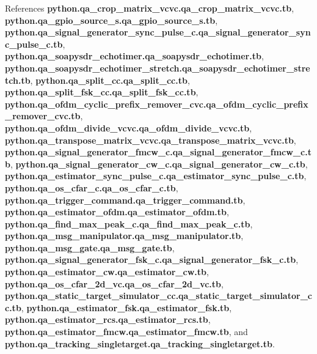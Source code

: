 References {\bf python.\+qa\+\_\+crop\+\_\+matrix\+\_\+vcvc.\+qa\+\_\+crop\+\_\+matrix\+\_\+vcvc.\+tb}, {\bf python.\+qa\+\_\+gpio\+\_\+source\+\_\+s.\+qa\+\_\+gpio\+\_\+source\+\_\+s.\+tb}, {\bf python.\+qa\+\_\+signal\+\_\+generator\+\_\+sync\+\_\+pulse\+\_\+c.\+qa\+\_\+signal\+\_\+generator\+\_\+sync\+\_\+pulse\+\_\+c.\+tb}, {\bf python.\+qa\+\_\+soapysdr\+\_\+echotimer.\+qa\+\_\+soapysdr\+\_\+echotimer.\+tb}, {\bf python.\+qa\+\_\+soapysdr\+\_\+echotimer\+\_\+stretch.\+qa\+\_\+soapysdr\+\_\+echotimer\+\_\+stretch.\+tb}, {\bf python.\+qa\+\_\+split\+\_\+cc.\+qa\+\_\+split\+\_\+cc.\+tb}, {\bf python.\+qa\+\_\+split\+\_\+fsk\+\_\+cc.\+qa\+\_\+split\+\_\+fsk\+\_\+cc.\+tb}, {\bf python.\+qa\+\_\+ofdm\+\_\+cyclic\+\_\+prefix\+\_\+remover\+\_\+cvc.\+qa\+\_\+ofdm\+\_\+cyclic\+\_\+prefix\+\_\+remover\+\_\+cvc.\+tb}, {\bf python.\+qa\+\_\+ofdm\+\_\+divide\+\_\+vcvc.\+qa\+\_\+ofdm\+\_\+divide\+\_\+vcvc.\+tb}, {\bf python.\+qa\+\_\+transpose\+\_\+matrix\+\_\+vcvc.\+qa\+\_\+transpose\+\_\+matrix\+\_\+vcvc.\+tb}, {\bf python.\+qa\+\_\+signal\+\_\+generator\+\_\+fmcw\+\_\+c.\+qa\+\_\+signal\+\_\+generator\+\_\+fmcw\+\_\+c.\+tb}, {\bf python.\+qa\+\_\+signal\+\_\+generator\+\_\+cw\+\_\+c.\+qa\+\_\+signal\+\_\+generator\+\_\+cw\+\_\+c.\+tb}, {\bf python.\+qa\+\_\+estimator\+\_\+sync\+\_\+pulse\+\_\+c.\+qa\+\_\+estimator\+\_\+sync\+\_\+pulse\+\_\+c.\+tb}, {\bf python.\+qa\+\_\+os\+\_\+cfar\+\_\+c.\+qa\+\_\+os\+\_\+cfar\+\_\+c.\+tb}, {\bf python.\+qa\+\_\+trigger\+\_\+command.\+qa\+\_\+trigger\+\_\+command.\+tb}, {\bf python.\+qa\+\_\+estimator\+\_\+ofdm.\+qa\+\_\+estimator\+\_\+ofdm.\+tb}, {\bf python.\+qa\+\_\+find\+\_\+max\+\_\+peak\+\_\+c.\+qa\+\_\+find\+\_\+max\+\_\+peak\+\_\+c.\+tb}, {\bf python.\+qa\+\_\+msg\+\_\+manipulator.\+qa\+\_\+msg\+\_\+manipulator.\+tb}, {\bf python.\+qa\+\_\+msg\+\_\+gate.\+qa\+\_\+msg\+\_\+gate.\+tb}, {\bf python.\+qa\+\_\+signal\+\_\+generator\+\_\+fsk\+\_\+c.\+qa\+\_\+signal\+\_\+generator\+\_\+fsk\+\_\+c.\+tb}, {\bf python.\+qa\+\_\+estimator\+\_\+cw.\+qa\+\_\+estimator\+\_\+cw.\+tb}, {\bf python.\+qa\+\_\+os\+\_\+cfar\+\_\+2d\+\_\+vc.\+qa\+\_\+os\+\_\+cfar\+\_\+2d\+\_\+vc.\+tb}, {\bf python.\+qa\+\_\+static\+\_\+target\+\_\+simulator\+\_\+cc.\+qa\+\_\+static\+\_\+target\+\_\+simulator\+\_\+cc.\+tb}, {\bf python.\+qa\+\_\+estimator\+\_\+fsk.\+qa\+\_\+estimator\+\_\+fsk.\+tb}, {\bf python.\+qa\+\_\+estimator\+\_\+rcs.\+qa\+\_\+estimator\+\_\+rcs.\+tb}, {\bf python.\+qa\+\_\+estimator\+\_\+fmcw.\+qa\+\_\+estimator\+\_\+fmcw.\+tb}, and {\bf python.\+qa\+\_\+tracking\+\_\+singletarget.\+qa\+\_\+tracking\+\_\+singletarget.\+tb}.

